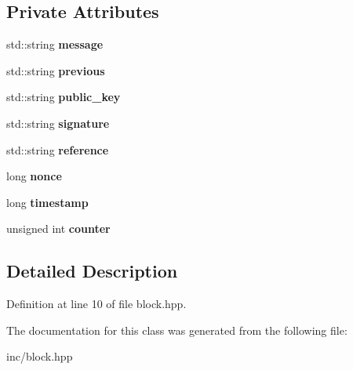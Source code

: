 \subsection*{Private Attributes}
\begin{DoxyCompactItemize}
\item 
std\+::string {\bfseries message}\hypertarget{classBlock_aecb8c4ea2bf54e178e2561c8e426aca6}{}\label{classBlock_aecb8c4ea2bf54e178e2561c8e426aca6}

\item 
std\+::string {\bfseries previous}\hypertarget{classBlock_a7d00d09357ecd86f79e169016eb49104}{}\label{classBlock_a7d00d09357ecd86f79e169016eb49104}

\item 
std\+::string {\bfseries public\+\_\+key}\hypertarget{classBlock_a5757089a751fdc05ad78e3257813a55c}{}\label{classBlock_a5757089a751fdc05ad78e3257813a55c}

\item 
std\+::string {\bfseries signature}\hypertarget{classBlock_aecdc5380b6dd3833840ea28a504ea3aa}{}\label{classBlock_aecdc5380b6dd3833840ea28a504ea3aa}

\item 
std\+::string {\bfseries reference}\hypertarget{classBlock_a3b8f62b26738fc7fd30f500646f83432}{}\label{classBlock_a3b8f62b26738fc7fd30f500646f83432}

\item 
long {\bfseries nonce}\hypertarget{classBlock_a5dc13805185f799f0057e3dd9c5179a7}{}\label{classBlock_a5dc13805185f799f0057e3dd9c5179a7}

\item 
long {\bfseries timestamp}\hypertarget{classBlock_acaa9f7ad0f75fdafc83a435d2c38425d}{}\label{classBlock_acaa9f7ad0f75fdafc83a435d2c38425d}

\item 
unsigned int {\bfseries counter}\hypertarget{classBlock_a96a75420cb1bb31ac1d6c3d9a79e2db1}{}\label{classBlock_a96a75420cb1bb31ac1d6c3d9a79e2db1}

\end{DoxyCompactItemize}


\subsection{Detailed Description}


Definition at line 10 of file block.\+hpp.



The documentation for this class was generated from the following file\+:\begin{DoxyCompactItemize}
\item 
inc/block.\+hpp\end{DoxyCompactItemize}
